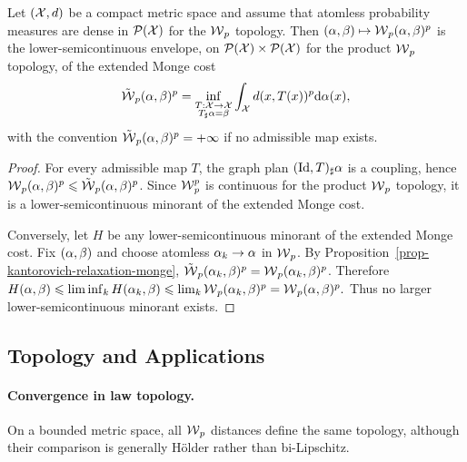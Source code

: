 \begin{cor}\label{cor-wasserstein-lsc-envelope-monge-distance}
Let $(\mathcal{X},d)$ be a compact metric space and assume that atomless probability measures are dense in $\mathcal{P}(\mathcal{X})$ for the $\operatorname{\mathcal{W}}_p$ topology. Then $(\alpha,\beta)\mapsto\operatorname{\mathcal{W}}_p(\alpha,\beta)^p$ is the lower-semicontinuous envelope, on $\mathcal{P}(\mathcal{X})\times\mathcal{P}(\mathcal{X})$ for the product $\operatorname{\mathcal{W}}_p$ topology, of the extended Monge cost
\[
\tilde{\operatorname{\mathcal{W}}}_p(\alpha,\beta)^p
=
\inf_{\substack{T:\mathcal{X}\to\mathcal{X}\\ T_\sharp\alpha=\beta}}
\int_{\mathcal{X}} d(x,T(x))^p\mathrm{d}\alpha(x),
\]
with the convention $\tilde{\operatorname{\mathcal{W}}}_p(\alpha,\beta)^p=+\infty$ if no admissible map exists.
\end{cor}
\begin{proof}
For every admissible map $T$, the graph plan $(\mathrm{Id},T)_\sharp\alpha$ is a coupling, hence $\operatorname{\mathcal{W}}_p(\alpha,\beta)^p\leqslant \tilde{\operatorname{\mathcal{W}}}_p(\alpha,\beta)^p$. Since $\operatorname{\mathcal{W}}_p^p$ is continuous for the product $\operatorname{\mathcal{W}}_p$ topology, it is a lower-semicontinuous minorant of the extended Monge cost.

Conversely, let $H$ be any lower-semicontinuous minorant of the extended Monge cost. Fix $(\alpha,\beta)$ and choose atomless $\alpha_k\to\alpha$ in $\operatorname{\mathcal{W}}_p$. By Proposition~\ref{prop-kantorovich-relaxation-monge}, $\tilde{\operatorname{\mathcal{W}}}_p(\alpha_k,\beta)^p=\operatorname{\mathcal{W}}_p(\alpha_k,\beta)^p$. Therefore
\(H(\alpha,\beta) \leqslant \liminf_k H(\alpha_k,\beta) \leqslant \lim_k \operatorname{\mathcal{W}}_p(\alpha_k,\beta)^p = \operatorname{\mathcal{W}}_p(\alpha,\beta)^p.\)
Thus no larger lower-semicontinuous minorant exists.
\end{proof}
\subsection{Topology and Applications}
\label{sec-wasserstein-topology-applications}
\paragraph{Convergence in law topology.}
On a bounded metric space, all $\operatorname{\mathcal{W}}_p$ distances define the same topology, although their comparison is generally H\"older rather than bi-Lipschitz.

